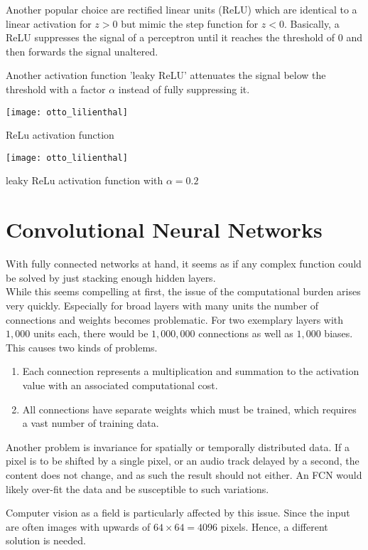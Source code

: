 Another popular choice are rectified linear units (ReLU) which are identical to a linear activation for $z > 0$ but mimic the step function for $z < 0$.
Basically, a ReLU suppresses the signal of a perceptron until it reaches the threshold of $0$ and then forwards the signal unaltered.

Another activation function 'leaky ReLU' attenuates the signal below the threshold with a factor $\alpha$ instead of fully suppressing it.
\begin{marginfigure}
    \texttt{[image: otto\_lilienthal]}
    \caption[]{ReLu activation function}
\end{marginfigure}
\begin{marginfigure}
    \texttt{[image: otto\_lilienthal]}
    \caption[]{leaky ReLu activation function with $\alpha = 0.2$}
\end{marginfigure}

\section{Convolutional Neural Networks}
With fully connected networks at hand, it seems as if any complex function could be solved by just stacking enough hidden layers.\\
While this seems compelling at first, the issue of the computational burden arises very quickly.
Especially for broad layers with many units the number of connections and weights becomes problematic.
For two exemplary layers with $1,000$ units each, there would be $1,000,000$ connections as well as $1,000$ biases.
This causes two kinds of problems.
\begin{enumerate}
    \item Each connection represents a multiplication and summation to the activation value with an associated computational cost.
    \item All connections have separate weights which must be trained, which requires a vast number of training data.
\end{enumerate}

Another problem is invariance for spatially or temporally distributed data.
If a pixel is to be shifted by a single pixel, or an audio track delayed by a second, the content does not change, and as such the result should not either.
An FCN would likely over-fit the data and be susceptible to such variations.

Computer vision as a field is particularly affected by this issue.
Since the input are often images with upwards of $64 \times 64 = 4096$ pixels.
Hence, a different solution is needed.

